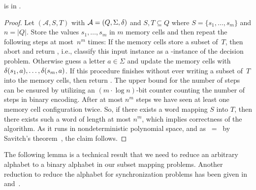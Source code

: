 \begin{proposition}\label{prelim:thm:ST-PSPACE}
	\ST is in \PSPACE.
\end{proposition}
\begin{proof}
	Let $(\mathcal A, S, T)$ with $\mathcal A = (Q, \Sigma, \delta)$
	and $S, T \subseteq Q$ where $S = \{s_1, \ldots, s_m\}$ and $n = |Q|$.
	Store the values $s_1, \ldots, s_m$ in $m$ memory cells
	and then repeat the following steps
	at most~$n^m$ times:  
	If the memory cells store a subset of~$T$, then abort and return \rYES, i.e., classify 
	this input instance as a \rYES-instance of the decision problem.
	Otherwise
	guess a letter $a \in \Sigma$ and update the memory cells
	with $\delta(s_1,a), \ldots, \delta(s_m,a)$.
	If this procedure finishes without ever writing a subset of~$T$ into the memory cells, 
	then return \rNO.
	The upper bound for the number of steps
	can be ensured by utilizing an  $(m\cdot \log n)$-bit counter 
	counting the number of steps in binary encoding.
	After at most $n^m$
	steps we have seen at least one memory cell configuration twice.
	So, if there exists a word mapping $S$ into $T$, then
	there exists such a word of length at most $n^m$,
	which implies correctness of the algorithm.
	As it runs in nondeterministic polynomial space,
	and as \PSPACE\  = \NPSPACE\ by Savitch's theorem~\cite{DBLP:journals/jcss/Savitch70},
	the claim follows.
\end{proof}

The following lemma is a technical result that we need to reduce an arbitrary alphabet to a binary alphabet
in our subset mapping problems.
Another reduction to reduce the alphabet for synchronization problems has been given
in~\cite[Sec.~5]{Martyugin12} and~\cite[Prop.~2]{Martyugin14}.


